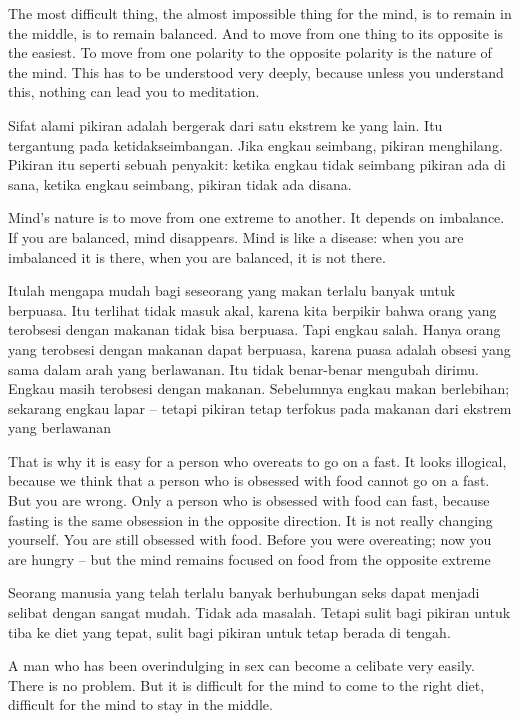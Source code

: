 \english
The most difficult thing, the almost impossible thing for the mind, is to remain in the middle, is to remain balanced. And to move from one thing to its opposite is the easiest. To move from one polarity to the opposite polarity is the nature of the mind. This has to be understood very deeply, because unless you understand this, nothing can lead you to meditation.

\bahasa
Sifat alami pikiran adalah bergerak dari satu ekstrem ke yang lain. Itu tergantung pada ketidakseimbangan. Jika engkau seimbang, pikiran menghilang. Pikiran itu seperti sebuah penyakit: ketika engkau tidak seimbang pikiran ada di sana, ketika engkau seimbang, pikiran tidak ada disana.

\english
Mind's nature is to move from one extreme to another. It depends on imbalance. If you are balanced, mind disappears. Mind is like a disease: when you are imbalanced it is there, when you are balanced, it is not there.

\bahasa
Itulah mengapa mudah bagi seseorang yang makan terlalu banyak untuk berpuasa. Itu terlihat tidak masuk akal, karena kita berpikir bahwa orang yang terobsesi dengan makanan tidak bisa berpuasa. Tapi engkau salah. Hanya orang yang terobsesi dengan makanan dapat berpuasa, karena puasa adalah obsesi yang sama dalam arah yang berlawanan. Itu tidak benar-benar mengubah dirimu. Engkau masih terobsesi dengan makanan. Sebelumnya engkau makan berlebihan; sekarang engkau lapar -- tetapi pikiran tetap terfokus pada makanan dari ekstrem yang berlawanan

\english
That is why it is easy for a person who overeats to go on a fast. It looks illogical, because we think that a person who is obsessed with food cannot go on a fast. But you are wrong. Only a person who is obsessed with food can fast, because fasting is the same obsession in the opposite direction. It is not really changing yourself. You are still obsessed with food. Before you were overeating; now you are hungry -- but the mind remains focused on food from the opposite extreme

\bahasa
Seorang manusia yang telah terlalu banyak berhubungan seks dapat menjadi selibat dengan sangat mudah. Tidak ada masalah. Tetapi sulit bagi pikiran untuk tiba ke diet yang tepat, sulit bagi pikiran untuk tetap berada di tengah.

\english
A man who has been overindulging in sex can become a celibate very easily. There is no problem. But it is difficult for the mind to come to the right diet, difficult for the mind to stay in the middle.

